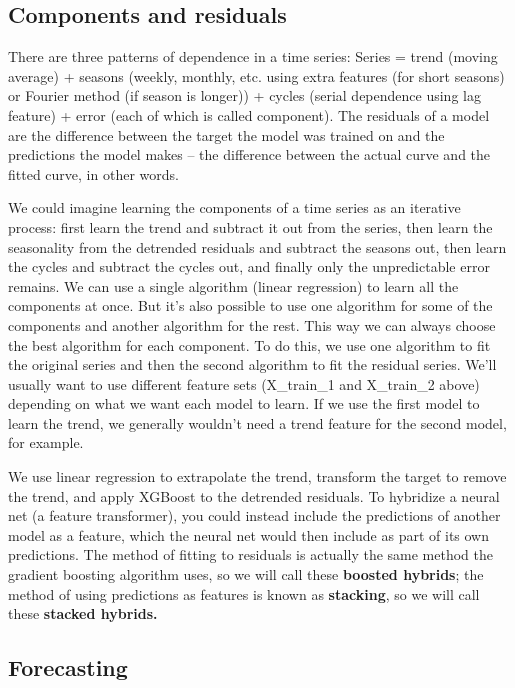 \documentclass[12pt]{report}
\begin{document}
\subsection{Components and residuals}

There are three patterns of dependence in a time series: Series = trend (moving average) + seasons (weekly, monthly, etc. using extra features (for short seasons) or Fourier method (if season is longer)) + cycles (serial dependence using lag feature) + error (each of which is called component). The residuals of a model are the difference between the target the model was trained on and the predictions the model makes -- the difference between the actual curve and the fitted curve, in other words.

We could imagine learning the components of a time series as an iterative process: first learn the trend and subtract it out from the series, then learn the seasonality from the detrended residuals and subtract the seasons out, then learn the cycles and subtract the cycles out, and finally only the unpredictable error remains. We can use a single algorithm (linear regression) to learn all the components at once. But it's also possible to use one algorithm for some of the components and another algorithm for the rest. This way we can always choose the best algorithm for each component. To do this, we use one algorithm to fit the original series and then the second algorithm to fit the residual series. We'll usually want to use different feature sets (X\_train\_1 and X\_train\_2 above) depending on what we want each model to learn. If we use the first model to learn the trend, we generally wouldn't need a trend feature for the second model, for example.

We use linear regression to extrapolate the trend, transform the target to remove the trend, and apply XGBoost to the detrended residuals. To hybridize a neural net (a feature transformer), you could instead include the predictions of another model as a feature, which the neural net would then include as part of its own predictions. The method of fitting to residuals is actually the same method the gradient boosting algorithm uses, so we will call these \textbf{boosted hybrids}; the method of using predictions as features is known as \textbf{stacking}, so we will call these \textbf{stacked hybrids.}


\subsection{Forecasting}
\end{document}
